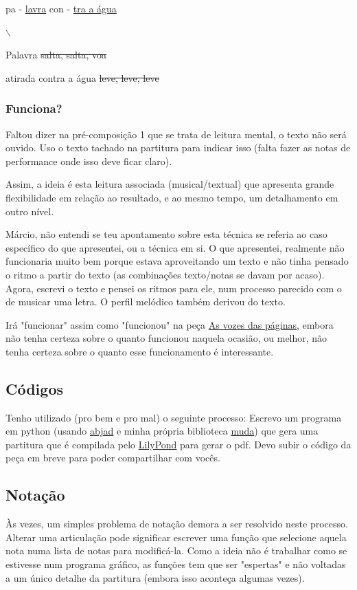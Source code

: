 \documentclass[a4paper, 12pt]{article}
\begin{document}
pa - \uline{lavra} con - \uline{tra a água}

$\backslash$

Palavra \sout{salta, salta, voa}

atirada contra a água \sout{leve, leve, leve}

\subsubsection*{Funciona?}
\label{sec:org10708bc}
Faltou dizer na pré-composição 1 que se trata de leitura mental, o texto não será ouvido. Uso o texto tachado na partitura para indicar isso (falta fazer as notas de performance onde isso deve ficar claro).

Assim, a ideia é esta leitura associada (musical/textual) que apresenta grande flexibilidade em relação ao resultado, e ao mesmo tempo, um detalhamento em outro nível.

Márcio, não entendi se teu apontamento sobre esta técnica se referia ao caso específico do que apresentei, ou a técnica em si. O que apresentei, realmente não funcionaria muito bem porque estava aproveitando um texto e não tinha pensado o ritmo a partir do texto (as combinações texto/notas se davam por acaso). Agora, escrevi o texto e pensei os ritmos para ele, num processo parecido com o de musicar uma letra. O perfil melódico também derivou do texto.

Irá "funcionar" assim como "funcionou" na peça \href{https://www.youtube.com/watch?v=StGfpgi3p10}{As vozes das páginas}, embora não tenha certeza sobre o quanto funcionou naquela ocasião, ou melhor, não tenha certeza sobre o quanto esse funcionamento é interessante.

\subsection*{Códigos}
\label{sec:org579ff6d}
Tenho utilizado (pro bem e pro mal) o seguinte processo: Escrevo um programa em python (usando \href{https://abjad.github.io/}{abjad} e minha própria biblioteca \href{https://github.com/DaviRaubach/muda}{muda}) que gera uma partitura que é compilada pelo \href{https://lilypond.org/}{LilyPond} para gerar o pdf.
Devo subir o código da peça em breve para poder compartilhar com vocês.

\subsection*{Notação}
\label{sec:orgcb170b3}
Às vezes, um simples problema de notação demora a ser resolvido neste processo. Alterar uma articulação pode significar escrever uma função que selecione aquela nota numa lista de notas para modificá-la. Como a ideia não é trabalhar como se estivesse num programa gráfico, as funções tem que ser "espertas" e não voltadas a um único detalhe da partitura (embora isso aconteça algumas vezes).
\end{document}
